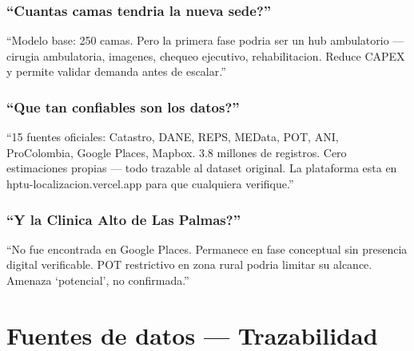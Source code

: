 \documentclass[11pt, a4paper]{article}
\begin{document}
\subsubsection{``Cuantas camas tendria la nueva sede?''}
\begin{tip}
``Modelo base: 250 camas. Pero la primera fase podria ser un hub ambulatorio --- cirugia ambulatoria, imagenes, chequeo ejecutivo, rehabilitacion. Reduce CAPEX y permite validar demanda antes de escalar.''
\end{tip}

\subsubsection{``Que tan confiables son los datos?''}
\begin{tip}
``15 fuentes oficiales: Catastro, DANE, REPS, MEData, POT, ANI, ProColombia, Google Places, Mapbox. 3.8 millones de registros. Cero estimaciones propias --- todo trazable al dataset original. La plataforma esta en hptu-localizacion.vercel.app para que cualquiera verifique.''
\end{tip}

\subsubsection{``Y la Clinica Alto de Las Palmas?''}
\begin{tip}
``No fue encontrada en Google Places. Permanece en fase conceptual sin presencia digital verificable. POT restrictivo en zona rural podria limitar su alcance. Amenaza `potencial', no confirmada.''
\end{tip}


\section{Fuentes de datos --- Trazabilidad}
\end{document}
